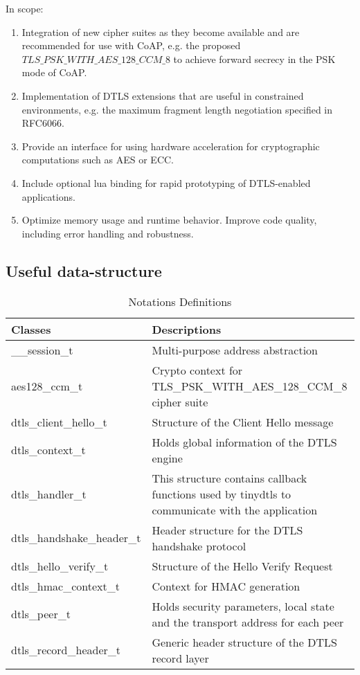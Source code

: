 In scope:
\begin{enumerate}
    \item Integration of new cipher suites as they become available and are recommended for use with CoAP, e.g. the proposed $TLS\_PSK\_WITH\_AES\_128\_CCM\_8$ to achieve forward secrecy in the PSK mode of CoAP.
    
    \item Implementation of DTLS extensions that are useful in constrained environments, e.g. the maximum fragment length negotiation specified in RFC6066.
    
    \item Provide an interface for using hardware acceleration for cryptographic computations such as AES or ECC.
    
    \item Include optional lua binding for rapid prototyping of DTLS-enabled applications.
    
    \item Optimize memory usage and runtime behavior. Improve code quality, including error handling and robustness.
\end{enumerate}

\subsection{Useful data-structure}

\begin{table}[H]
\caption{Notations Definitions }
\label{cryptoTable}
\begin{tabular}{ |p{5cm}|p{10cm}|}
\hline
\hline
\textbf{Classes} & \textbf{Descriptions} \\
 \hline
 \hline
\_\_session\_t & Multi-purpose address abstraction \\ 
 \hline 
aes128\_ccm\_t &	Crypto context for TLS\_PSK\_WITH\_AES\_128\_CCM\_8 cipher suite\\
\hline
dtls\_client\_hello\_t &	Structure of the Client Hello message\\
\hline 
dtls\_context\_t &	Holds global information of the DTLS engine\\
\hline 
dtls\_handler\_t &	This structure contains callback functions used by tinydtls to communicate with the application\\
\hline 
dtls\_handshake\_header\_t	&Header structure for the DTLS handshake protocol\\
\hline 
dtls\_hello\_verify\_t	& Structure of the Hello Verify Request\\
\hline 
dtls\_hmac\_context\_t	& Context for HMAC generation\\
\hline 
dtls\_peer\_t &	Holds security parameters, local state and the transport address for each peer\\
\hline 
dtls\_record\_header\_t &Generic header structure of the DTLS record layer\\
 \hline
\end{tabular}\\

\end{table}
  